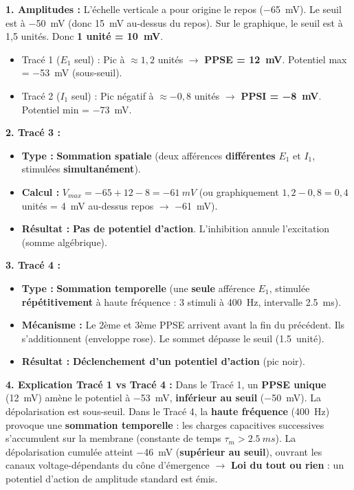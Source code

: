 \documentclass[11pt]{article}
\begin{document}
\begin{corrige}
\textbf{1. Amplitudes :}
L'échelle verticale a pour origine le repos (\SI{-65}{mV}). Le seuil est à \SI{-50}{mV} (donc \SI{15}{mV} au-dessus du repos). Sur le graphique, le seuil est à 1,5 unités. Donc \textbf{1 unité = \SI{10}{mV}}.
\begin{itemize}
    \item Tracé 1 ($E_1$ seul) : Pic à $\approx 1,2$ unités $\rightarrow$ \textbf{PPSE = \SI{+12}{mV}}. Potentiel max = \SI{-53}{mV} (sous-seuil).
    \item Tracé 2 ($I_1$ seul) : Pic négatif à $\approx -0,8$ unités $\rightarrow$ \textbf{PPSI = \SI{-8}{mV}}. Potentiel min = \SI{-73}{mV}.
\end{itemize}

\textbf{2. Tracé 3 :}
\begin{itemize}
    \item \textbf{Type :} \textbf{Sommation spatiale} (deux afférences \textbf{différentes} $E_1$ et $I_1$, stimulées \textbf{simultanément}).
    \item \textbf{Calcul :} $V_{max} = -65 + 12 - 8 = \SI{-61}{mV}$ (ou graphiquement $1,2 - 0,8 = 0,4$ unités = \SI{4}{mV} au-dessus repos $\rightarrow$ \SI{-61}{mV}).
    \item \textbf{Résultat :} \textbf{Pas de potentiel d'action}. L'inhibition annule l'excitation (somme algébrique).
\end{itemize}

\textbf{3. Tracé 4 :}
\begin{itemize}
    \item \textbf{Type :} \textbf{Sommation temporelle} (une \textbf{seule} afférence $E_1$, stimulée \textbf{répétitivement} à haute fréquence : 3 stimuli à \SI{400}{Hz}, intervalle \SI{2,5}{ms}).
    \item \textbf{Mécanisme :} Le 2ème et 3ème PPSE arrivent avant la fin du précédent. Ils s'additionnent (enveloppe rose). Le sommet dépasse le seuil (\SI{1,5}{unité}).
    \item \textbf{Résultat :} \textbf{Déclenchement d'un potentiel d'action} (pic noir).
\end{itemize}

\textbf{4. Explication Tracé 1 vs Tracé 4 :}
Dans le Tracé 1, un \textbf{PPSE unique} (\SI{+12}{mV}) amène le potentiel à \SI{-53}{mV}, \textbf{inférieur au seuil} (\SI{-50}{mV}). La dépolarisation est sous-seuil.
Dans le Tracé 4, la \textbf{haute fréquence} (\SI{400}{Hz}) provoque une \textbf{sommation temporelle} : les charges capacitives successives s'accumulent sur la membrane (constante de temps $\tau_m > \SI{2,5}{ms}$). La dépolarisation cumulée atteint \SI{-46}{mV} (\textbf{supérieur au seuil}), ouvrant les canaux  voltage-dépendants du cône d'émergence $\rightarrow$ \textbf{Loi du tout ou rien} : un potentiel d'action de amplitude standard est émis.
\end{corrige}
\end{document}
